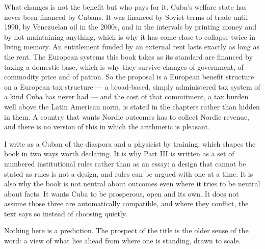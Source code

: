 What changes is not the benefit but who pays for it. Cuba's welfare state has
never been financed by Cubans. It was financed by Soviet terms of trade until
1990, by Venezuelan oil in the 2000s, and in the intervals by printing money
and by not maintaining anything, which is why it has come close to collapse
twice in living memory. An entitlement funded by an external rent lasts exactly
as long as the rent. The European systems this book takes as its standard are
financed by taxing a domestic base, which is why they survive changes of
government, of commodity price and of patron. So the proposal is a European
benefit structure on a European tax structure --- a broad-based, simply
administered tax system of a kind Cuba has never had --- and the cost of that
commitment, a tax burden well above the Latin American norm, is stated in the
chapters rather than hidden in them. A country that wants Nordic outcomes has
to collect Nordic revenue, and there is no version of this in which the
arithmetic is pleasant.

I write as a Cuban of the diaspora and a physicist by training, which shapes
the book in two ways worth declaring. It is why Part III is written as a set of
numbered institutional rules rather than as an essay: a design that cannot be
stated as rules is not a design, and rules can be argued with one at a time. It
is also why the book is not neutral about outcomes even where it tries to be
neutral about facts. It wants Cuba to be prosperous, open and its own. It does
not assume those three are automatically compatible, and where they conflict,
the text says so instead of choosing quietly.

Nothing here is a prediction. The prospect of the title is the older sense of
the word: a view of what lies ahead from where one is standing, drawn to scale.
